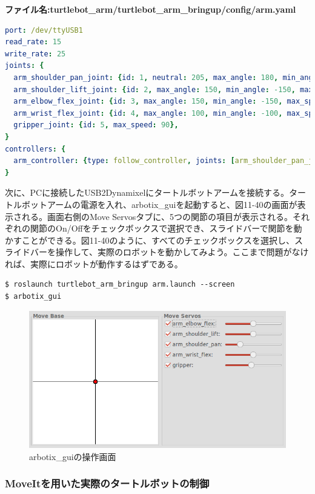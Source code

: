 \textbf{ファイル名:turtlebot\_arm/turtlebot\_arm\_bringup/config/arm.yaml}
\begin{lstlisting}[language=YAML]
port: /dev/ttyUSB1
read_rate: 15
write_rate: 25
joints: {
  arm_shoulder_pan_joint: {id: 1, neutral: 205, max_angle: 180, min_angle: -60, max_speed: 90},
  arm_shoulder_lift_joint: {id: 2, max_angle: 150, min_angle: -150, max_speed: 90},
  arm_elbow_flex_joint: {id: 3, max_angle: 150, min_angle: -150, max_speed: 90},
  arm_wrist_flex_joint: {id: 4, max_angle: 100, min_angle: -100, max_speed: 90},
  gripper_joint: {id: 5, max_speed: 90},
}
controllers: {
  arm_controller: {type: follow_controller, joints: [arm_shoulder_pan_joint, arm_shoulder_lift_joint, arm_elbow_flex_joint, arm_wrist_flex_joint], action_name: arm_controller/follow_joint_trajectory, onboard: False }
}
\end{lstlisting}

次に、PCに接続したUSB2Dynamixelにタートルボットアームを接続する。タートルボットアームの電源を入れ、arbotix\_guiを起動すると、図11-40の画面が表示される。画面右側のMove Servosタブに、5つの関節の項目が表示される。それぞれの関節のOn/Offをチェックボックスで選択でき、スライドバーで関節を動かすことができる。図11-40のように、すべてのチェックボックスを選択し、スライドバーを操作して、実際のロボットを動かしてみよう。ここまで問題がなければ、実際にロボットが動作するはずである。

\begin{lstlisting}[language=ROS]
$ roslaunch turtlebot_arm_bringup arm.launch --screen
$ arbotix_gui
\end{lstlisting}

\begin{figure}[htp]
  \centering
  \includegraphics[width=12cm]{pictures/chapter11/pic_11_40.png}
  \caption{arbotix\_guiの操作画面}
\end{figure}

\subsubsection{MoveItを用いた実際のタートルボットの制御}


